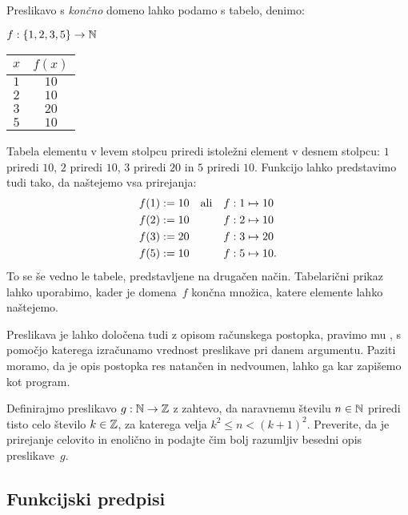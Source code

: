 Preslikavo s \emph{končno} domeno lahko podamo s tabelo, denimo:
%
\begin{center}
  $f : \left\{1, 2, 3, 5\right\} \to \mathbb{N}$

  \medskip

  \begin{tabular}{cc}
    \toprule
    $x$ & $f(x)$ \\ \midrule
    $1$ & $10$ \\ 
    $2$ & $10$ \\ 
    $3$ & $20$ \\ 
    $5$ & $10$ \\ \bottomrule
  \end{tabular}
\end{center}
%
Tabela elementu v levem stolpcu priredi istoležni element v desnem stolpcu: $1$ priredi $10$, $2$ priredi $10$, $3$ priredi $20$ in $5$ priredi $10$. Funkcijo lahko predstavimo tudi tako, da naštejemo vsa prirejanja:
%
\begin{align*}
  f(1) &\mathrel{{:}{=}} 10    &&\text{ali}&    f : 1 &\mapsto 10 \\
  f(2) &\mathrel{{:}{=}} 10    &&&    f : 2 &\mapsto 10 \\
  f(3) &\mathrel{{:}{=}} 20    &&&    f : 3 &\mapsto 20 \\
  f(5) &\mathrel{{:}{=}} 10    &&&    f : 5 &\mapsto 10.
\end{align*}
%
To se še vedno le tabele, predstavljene na drugačen način.
%
Tabelarični prikaz lahko uporabimo, kader je domena~$f$ končna množica, katere elemente lahko naštejemo.

Preslikava je lahko določena tudi z opisom računskega postopka, pravimo mu ,
s pomočjo katerega izračunamo vrednost preslikave pri danem argumentu. Paziti moramo, da je
opis postopka res natančen in nedvoumen, lahko ga kar zapišemo kot program.

\begin{vaja}
 Definirajmo preslikavo $g : \mathbb{N} \to \mathbb{Z}$ z zahtevo, da naravnemu številu $n \in \mathbb{N}$ priredi tisto celo število $k \in \mathbb{Z}$, za katerega velja $k^2 \leq n < (k+1)^2$.
 Preverite, da je prirejanje celovito in enolično in podajte čim bolj razumljiv besedni opis preslikave~$g$.
\end{vaja}


\subsection{Funkcijski predpisi}
\label{sec:funkcijski-predpisi}

